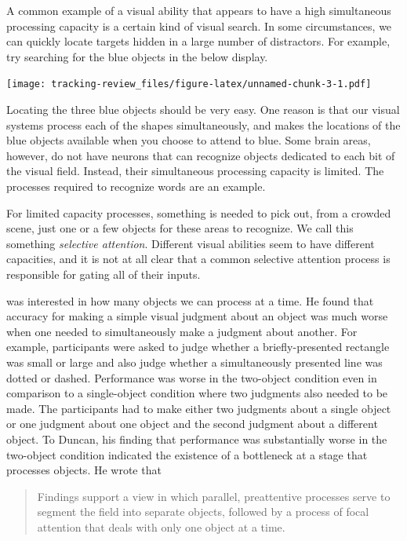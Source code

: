 \documentclass[]{book}
\begin{document}
A common example of a visual ability that appears to have a high simultaneous processing capacity is a certain kind of visual search. In some circumstances, we can quickly locate targets hidden in a large number of distractors. For example, try searching for the blue objects in the below display.

\texttt{[image: tracking-review\_files/figure-latex/unnamed-chunk-3-1.pdf]}

Locating the three blue objects should be very easy. One reason is that our visual systems process each of the shapes simultaneously, and makes the locations of the blue objects available when you choose to attend to blue. Some brain areas, however, do not have neurons that can recognize objects dedicated to each bit of the visual field. Instead, their simultaneous processing capacity is limited. The processes required to recognize words are an example.

For limited capacity processes, something is needed to pick out, from a crowded scene, just one or a few objects for these areas to recognize. We call this something \emph{selective attention}. Different visual abilities seem to have different capacities, and it is not at all clear that a common selective attention process is responsible for gating all of their inputs.

\citet{duncanSelectiveAttentionOrganization1984} was interested in how many objects we can process at a time. He found that accuracy for making a simple visual judgment about an object was much worse when one needed to simultaneously make a judgment about another. For example, participants were asked to judge whether a briefly-presented rectangle was small or large and also judge whether a simultaneously presented line was dotted or dashed. Performance was worse in the two-object condition even in comparison to a single-object condition where two judgments also needed to be made. The participants had to make either two judgments about a single object or one judgment about one object and the second judgment about a different object. To Duncan, his finding that performance was substantially worse in the two-object condition indicated the existence of a bottleneck at a stage that processes objects. He wrote that

\begin{quote}
Findings support a view in which parallel, preattentive processes serve to segment the field into separate objects, followed by a process of focal attention that deals with only one object at a time.
\end{quote}
\end{document}

